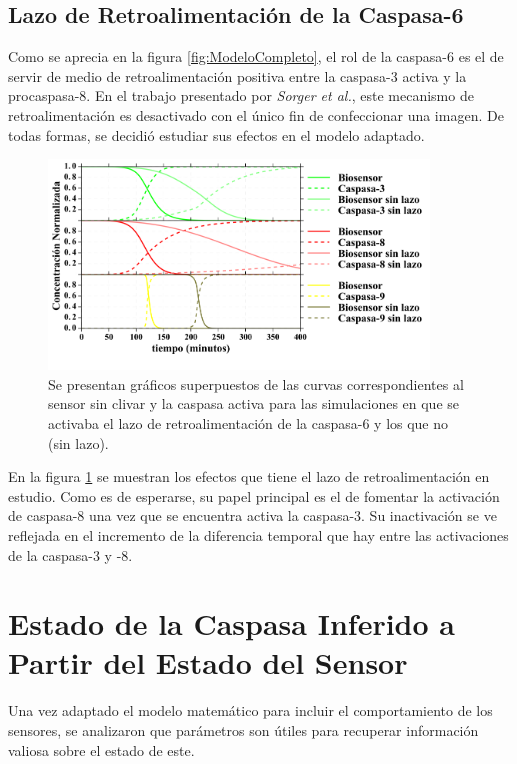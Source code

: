 \subsection{Lazo de Retroalimentación de la Caspasa-6}

Como se aprecia en la figura \ref{fig:ModeloCompleto}, el rol de la caspasa-6 es el de servir de medio de retroalimentación positiva entre la caspasa-3 activa y la procaspasa-8. En el trabajo presentado por \textit{Sorger et al.}, este mecanismo de retroalimentación es desactivado con el único fin de confeccionar una imagen. De todas formas, se decidió estudiar sus efectos en el modelo adaptado.

\begin{figure}
    \centering
    \includegraphics[width=0.9\textwidth]{./img/Cap3/ConSinC6.png}
    \caption{Se presentan gráficos superpuestos de las curvas correspondientes al sensor sin clivar y la caspasa activa para las simulaciones en que se activaba el lazo de retroalimentación de la caspasa-6 y los que no (sin lazo).}
    \label{fig:casp6}
\end{figure}

En la figura \ref{fig:casp6} se muestran los efectos que tiene el lazo de retroalimentación en estudio. Como es de esperarse, su papel principal es el de fomentar la activación de caspasa-8 una vez que se encuentra activa la caspasa-3. Su inactivación se ve reflejada en el incremento de la diferencia temporal que hay entre las activaciones de la caspasa-3 y -8.


\section{Estado de la Caspasa Inferido a Partir del Estado del Sensor}

Una vez adaptado el modelo matemático para incluir el comportamiento de los sensores, se analizaron que parámetros son útiles para recuperar información valiosa sobre el estado de este.

